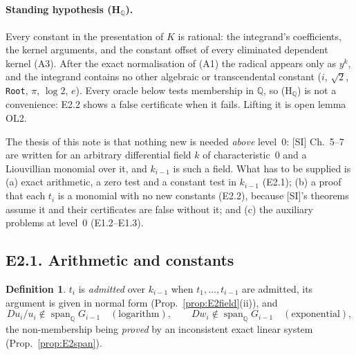\documentclass[11pt]{article}
\theoremstyle{definition}
\newtheorem{definition}[theorem]{Definition}
\theoremstyle{remark}
\newcommand{\Q}{\mathbb{Q}}
\newcommand{\code}[1]{\texttt{#1}}
\begin{document}
\paragraph{Standing hypothesis (H$_\Q$).} Every constant in the presentation of $K$ is
rational: the integrand's coefficients, the kernel arguments, and the constant offset of every
eliminated dependent kernel (A3). After the exact normalisation of (A1) the radical appears only
as $y^k$, and the integrand contains no other algebraic or transcendental constant ($i$,
$\sqrt2$, \code{Root}, $\pi$, $\log2$, $e$). Every oracle below
tests membership in $\Q$, so (H$_\Q$) is not a convenience: E2.2 shows a false certificate when
it fails. Lifting it is open lemma OL2.

The thesis of this note is that nothing new is needed \emph{above} level~0: [SI] Ch.~5--7
are written for an arbitrary differential field $k$ of characteristic~0 and a Liouvillian
monomial over it, and $k_{i-1}$ is such a field. What has to be supplied is (a) exact
arithmetic, a zero test and a constant test in $k_{i-1}$ (E2.1); (b) a proof that each
$t_i$ is a monomial with no new constants (E2.2), because [SI]'s theorems assume it and
their certificates are false without it; and (c) the auxiliary problems at level~0
(E1.2--E1.3).

\subsection*{E2.1. Arithmetic and constants}

\begin{definition}\label{def:E2adm}
$t_i$ is \emph{admitted} over $k_{i-1}$ when $t_1,\dots,t_{i-1}$ are admitted, its
argument is given in normal form (Prop.~\ref{prop:E2field}(ii)), and
\[ Du_i/u_i\notin\operatorname{span}_\Q G_{i-1}\quad(\text{logarithm}),\qquad
   Dw_i\notin\operatorname{span}_\Q G_{i-1}\quad(\text{exponential}), \]
the non-membership being \emph{proved} by an inconsistent exact linear system
(Prop.~\ref{prop:E2span}).
\end{definition}
\end{document}
